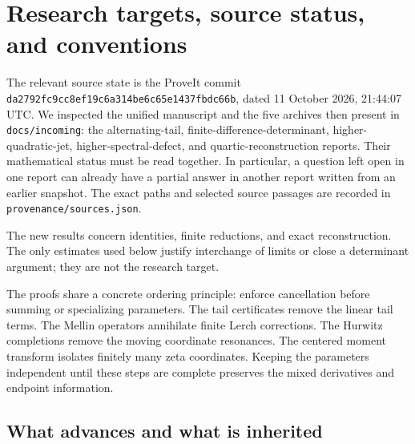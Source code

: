 \section{Research targets, source status, and conventions}
\label{sec:scope}

The relevant source state is the ProveIt commit
\texttt{da2792fc9cc8ef19c6a314be6c65e1437fbdc66b}, dated
11 October 2026, 21:44:07 UTC. We inspected the unified manuscript and
the five archives then present in \texttt{docs/incoming}: the alternating-tail,
finite-difference-determinant, higher-quadratic-jet, higher-spectral-defect,
and quartic-reconstruction reports. Their mathematical status must be read
together. In particular, a question left open in one report can already
have a partial answer in another report written from an earlier snapshot.
The exact paths and selected source passages are recorded in
\texttt{provenance/sources.json}.

The new results concern identities, finite reductions, and exact
reconstruction. The only estimates used below justify interchange of
limits or close a determinant argument; they are not the research target.

The proofs share a concrete ordering principle: enforce cancellation
before summing or specializing parameters. The tail certificates remove
the linear tail terms. The Mellin operators annihilate finite Lerch
corrections. The Hurwitz completions remove the moving coordinate
resonances. The centered moment transform isolates finitely many zeta
coordinates. Keeping the parameters independent until these steps are
complete preserves the mixed derivatives and endpoint information.

\subsection{What advances and what is inherited}

